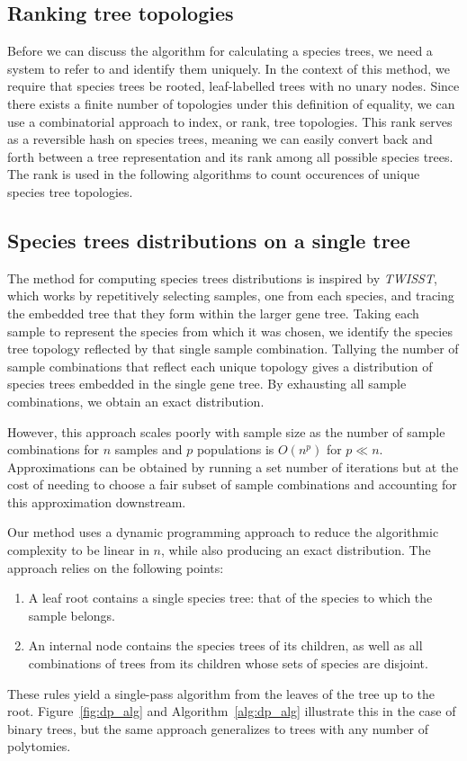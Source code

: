 \documentclass{article}
\newcommand{\twisst}{{\textit{TWISST}}}
\begin{document}
\subsection{Ranking tree topologies}

Before we can discuss the algorithm for calculating a species trees, we
need a system to refer to and identify them uniquely.
In the context of this method, we require that species trees be rooted,
leaf-labelled trees with no unary nodes.
Since there exists a finite number of topologies under this definition
of equality, we can use a combinatorial approach to index, or rank,
tree topologies.
This rank serves as a reversible hash on species trees, meaning we can
easily convert back and forth between a tree representation and its
rank among all possible species trees. The rank is used in the following
algorithms to count occurences of unique species tree topologies.

\subsection{Species trees distributions on a single tree}

The method for computing species trees distributions is inspired by
\twisst, which works
by repetitively selecting samples, one from each species, and tracing the
embedded tree that they form within the larger gene tree. Taking each
sample to represent the species from which it was chosen, we identify
the species tree topology reflected by that single sample combination.
Tallying the number of sample combinations that
reflect each unique topology gives a distribution of species trees
embedded in the single gene tree. By exhausting all sample combinations,
we obtain an exact distribution.

However, this approach scales poorly with sample size as the number
of sample combinations for $n$ samples and $p$ populations is $O(n^p)$ for
$p \ll n$. Approximations can be obtained by running a set number of iterations
but at the cost of needing to choose a fair subset of sample combinations and
accounting for this approximation downstream.

Our method uses a dynamic programming approach to reduce the algorithmic
complexity to be linear in $n$, while also producing an exact distribution.
The approach relies on the following points:
\begin{enumerate}
    \item A leaf root contains a single species tree: that of the species to
        which the sample belongs.
    \item An internal node contains the species trees of its children, as
        well as all combinations of trees from its children whose
        sets of species are disjoint.
\end{enumerate}
These rules yield a single-pass algorithm from the leaves of the tree
up to the root. Figure~\ref{fig:dp_alg} and Algorithm~\ref{alg:dp_alg}
illustrate this in the case of binary trees, but the same approach generalizes
to trees with any number of polytomies.
\end{document}
